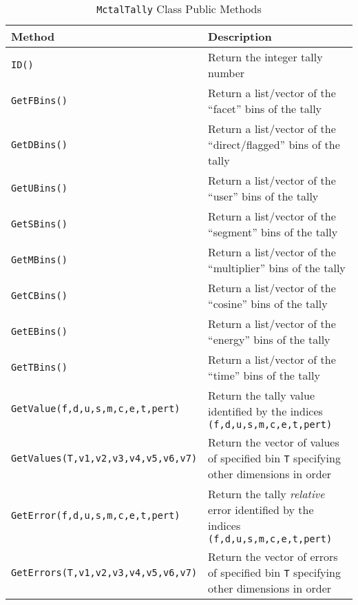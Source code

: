 \documentclass[11pt]{article}
\begin{document}
\begin{table}[]
  \begin{center}
  \caption{\texttt{MctalTally} Class Public Methods}
  \label{tab:mctaltally_class_public_methods}
    \begin{tabular}{lp{3.5in}}
      \toprule
        Method & Description \\
      \midrule
        \texttt{ID()}                           & Return the integer tally number \\
        \texttt{GetFBins()}                     & Return a list/vector of the ``facet'' bins of the tally \\
        \texttt{GetDBins()}                     & Return a list/vector of the ``direct/flagged'' bins of the tally \\
        \texttt{GetUBins()}                     & Return a list/vector of the ``user'' bins of the tally \\
        \texttt{GetSBins()}                     & Return a list/vector of the ``segment'' bins of the tally \\
        \texttt{GetMBins()}                     & Return a list/vector of the ``multiplier'' bins of the tally \\
        \texttt{GetCBins()}                     & Return a list/vector of the ``cosine'' bins of the tally \\
        \texttt{GetEBins()}                     & Return a list/vector of the ``energy'' bins of the tally \\
        \texttt{GetTBins()}                     & Return a list/vector of the ``time'' bins of the tally \\
        \texttt{GetValue(f,d,u,s,m,c,e,t,pert)} & Return the tally value identified by the indices \texttt{(f,d,u,s,m,c,e,t,pert)} \\
        \texttt{GetValues(T,v1,v2,v3,v4,v5,v6,v7)} & Return the vector of values of specified bin \texttt{T} specifying other dimensions in order\\
        \texttt{GetError(f,d,u,s,m,c,e,t,pert)} & Return the tally \emph{relative} error identified by the indices \texttt{(f,d,u,s,m,c,e,t,pert)} \\
        \texttt{GetErrors(T,v1,v2,v3,v4,v5,v6,v7)} & Return the vector of errors of specified bin \texttt{T} specifying other dimensions in order\\
      \bottomrule
    \end{tabular}
  \end{center}
\end{table}
\end{document}
